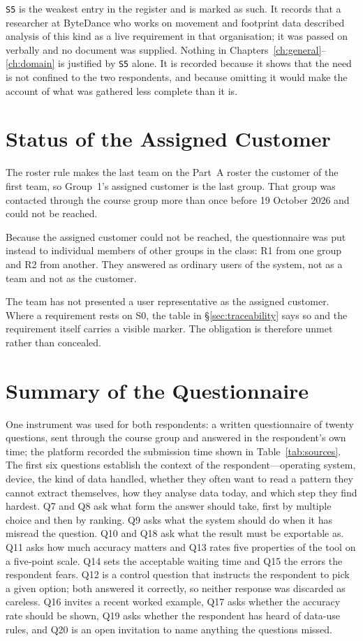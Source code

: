 \documentclass[12pt,a4paper]{report}
\begin{document}
\texttt{S5} is the weakest entry in the register and is marked as such. It
records that a researcher at ByteDance who works on movement and footprint
data described analysis of this kind as a live requirement in that
organisation; it was passed on verbally and no document was supplied. Nothing
in Chapters~\ref{ch:general}--\ref{ch:domain} is justified by \texttt{S5}
alone. It is recorded because it shows that the need is not confined to the
two respondents, and because omitting it would make the account of what was
gathered less complete than it is.

\section{Status of the Assigned Customer}
\label{sec:assigned-customer}

The roster rule makes the last team on the Part~A roster the customer of the
first team, so Group~1's assigned customer is the last group. That group was
contacted through the course group more than once before 19 October 2026 and
could not be reached.

Because the assigned customer could not be reached, the questionnaire was put
instead to individual members of other groups in the class: R1 from one group
and R2 from another. They answered as ordinary users of the system, not as a
team and not as the customer.

The team has not presented a user representative as the assigned customer.
Where a requirement rests on S0, the table in \S\ref{sec:traceability} says so
and the requirement itself carries a visible marker. The obligation is
therefore unmet rather than concealed.

\section{Summary of the Questionnaire}
\label{sec:questionnaire}

One instrument was used for both respondents: a written questionnaire of
twenty questions, sent through the course group and answered in the
respondent's own time; the platform recorded the submission time shown in
Table~\ref{tab:sources}. The first six questions establish the context of the
respondent---operating system, device, the kind of data handled, whether they
often want to read a pattern they cannot extract themselves, how they analyse
data today, and which step they find hardest. Q7 and Q8 ask what form the
answer should take, first by multiple choice and then by ranking. Q9 asks
what the system should do when it has misread the question. Q10 and Q18 ask
what the result must be exportable as. Q11 asks how much accuracy matters and
Q13 rates five properties of the tool on a five-point scale. Q14 sets the
acceptable waiting time and Q15 the errors the respondent fears. Q12 is a
control question that instructs the respondent to pick a given option; both
answered it correctly, so neither response was discarded as careless. Q16
invites a recent worked example, Q17 asks whether the accuracy rate should be
shown, Q19 asks whether the respondent has heard of data-use rules, and Q20
is an open invitation to name anything the questions missed.
\end{document}
